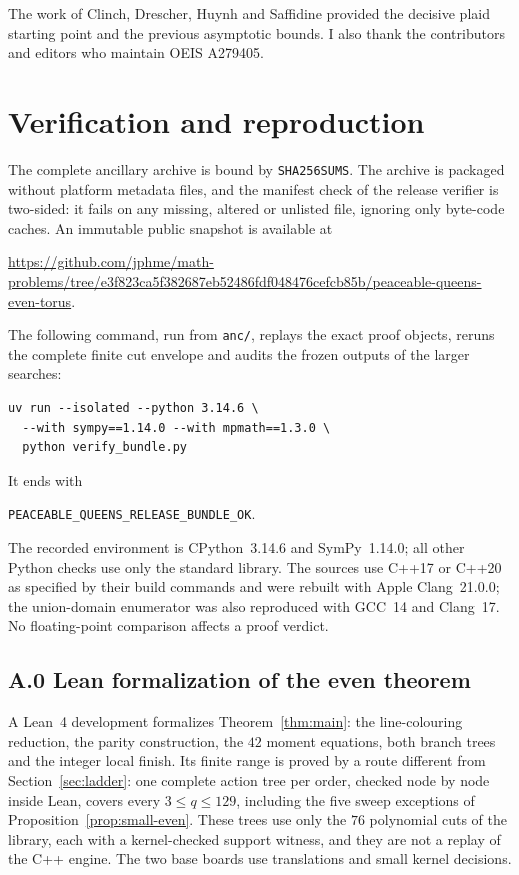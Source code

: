 \documentclass[11pt]{amsart}
\theoremstyle{definition}
\theoremstyle{remark}
\newcommand{\bs}{\discretionary{}{}{}}
\begin{document}
The work of Clinch, Drescher, Huynh and Saffidine provided the decisive plaid
starting point and the previous asymptotic bounds.  I also thank the
contributors and editors who maintain OEIS A279405.

\appendix

\section{Verification and reproduction}\label{app:verify}

\sloppy

The complete ancillary archive is bound by \texttt{SHA256SUMS}.  The archive
is packaged without platform metadata files, and the manifest check of the
release verifier is two-sided: it fails on any missing, altered or unlisted
file, ignoring only byte-code caches.  An immutable
public snapshot is available at
\begin{center}
\url{https://github.com/jphme/math-problems/tree/e3f823ca5f382687eb52486fdf048476cefcb85b/peaceable-queens-even-torus}.
\end{center}
The following command, run from \texttt{anc/}, replays the exact proof
objects, reruns the complete finite cut envelope and audits the frozen
outputs of the larger searches:
\begin{verbatim}
uv run --isolated --python 3.14.6 \
  --with sympy==1.14.0 --with mpmath==1.3.0 \
  python verify_bundle.py
\end{verbatim}
It ends with
\begin{center}
\texttt{PEACEABLE\_\bs{}QUEENS\_\bs{}RELEASE\_\bs{}BUNDLE\_\bs{}OK}.
\end{center}
The recorded environment is CPython~3.14.6 and SymPy~1.14.0; all other
Python checks use only the standard library.  The sources use C++17 or C++20
as specified by their build commands and were rebuilt with Apple
Clang~21.0.0; the union-domain enumerator was also reproduced with GCC~14 and
Clang~17.  No floating-point comparison affects a proof verdict.

\subsection*{A.0 Lean formalization of the even theorem}

A Lean~4 development formalizes Theorem~\ref{thm:main}: the line-colouring
reduction, the parity construction, the $42$ moment equations, both branch
trees and the integer local finish.  Its finite range is proved by a route
different from Section~\ref{sec:ladder}: one complete action tree per order,
checked node by node inside Lean, covers every $3\le q\le129$, including the
five sweep exceptions of Proposition~\ref{prop:small-even}.  These trees use
only the $76$ polynomial cuts of the library, each with a kernel-checked support
witness, and they are not a replay of the C++ engine.  The two base boards
use translations and small kernel decisions.
\end{document}

